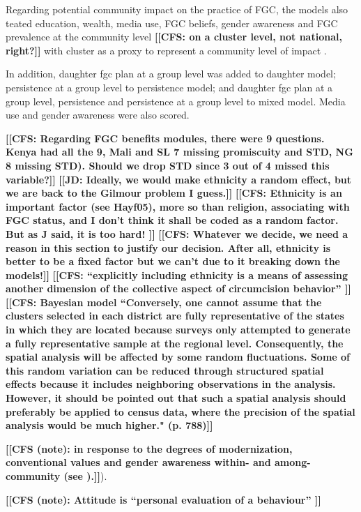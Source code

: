 \documentclass[12pt,]{article}
\newcommand{\comment}[1]{\textbf{[[#1]]}}
\newcommand{\cfcmt}[1]{\comment{CFS: #1}}
\newcommand{\cfonly}[1]{\comment{CFS (note): #1}}
\newcommand{\jdcmt}[1]{\comment{JD: #1}}
\begin{document}
Regarding potential community impact on the practice of FGC, the models also teated education, wealth, media use, FGC beliefs, gender awareness and FGC prevalence at the community level \cfcmt{on a cluster level, not national, right?} with cluster as a proxy to represent a community level of impact \cite{AligRen06, BoylSvec19, Hayf05, Krav02}.  

In addition, daughter fgc plan at a group level was added to daughter model; persistence at a group level to persistence model; and daughter fgc plan at a group level, persistence and persistence at a group level to mixed model.  Media use and gender awareness were also scored.  
 
 
\cfcmt{Regarding FGC benefits modules, there were 9 questions.  Kenya had all the 9, Mali and SL 7 missing promiscuity and STD, NG 8 missing STD).  Should we drop STD since 3 out of 4 missed this variable?}
\jdcmt{Ideally, we would make ethnicity a random effect, but we are back to the Gilmour problem I guess.} \cfcmt{Ethnicity is an important factor (see Hayf05), more so than religion, associating with FGC status, and I don't think it shall be coded as a random factor.  But as J said, it is too hard! } \cfcmt{Whatever we decide, we need a reason in this section to justify our decision. After all, ethnicity is better to be a fixed factor but we can’t due to it breaking down the models!}
\cfcmt{“explicitly including ethnicity is a means of assessing another dimension of the collective aspect of circumcision behavior” \cite{Hayf05}}
\cfcmt{Bayesian model \cite{KandNwak09} “Conversely, one cannot assume that the clusters selected in each district are fully representative of the states in which they are located because surveys only attempted to generate a fully representative sample at the regional level. Consequently, the spatial analysis will be affected by some random fluctuations.  Some of this random variation can be reduced through structured spatial effects because it includes neighboring observations in the analysis. However, it should be pointed out that such a spatial analysis should preferably be applied to census data, where the precision of the spatial analysis would be much higher." (p. 788)}

\cfonly {in response to the degrees of modernization, conventional values and gender awareness within- and among-community (see \cite{Achi14, BoylMcMo02, Hayf05, KandNwak09, ModrLiu13, Moor13, OdukAfol17, Youn02}).}).  

\cfonly{Attitude is “personal evaluation of a behaviour” \cite{Ajze91}}
\end{document}
